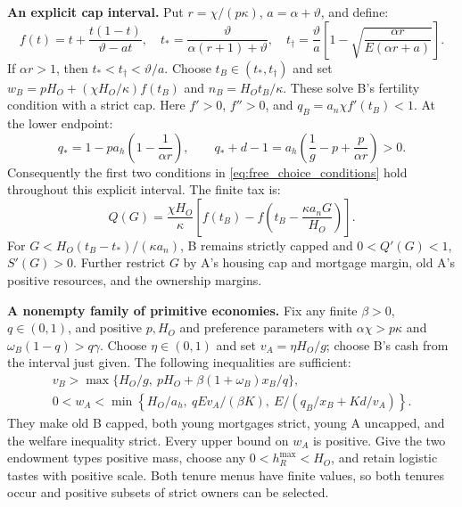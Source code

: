 \documentclass[11pt]{article}
\begin{document}
\textbf{An explicit cap interval.} Put $r=\chi/(p\kappa)$,
$a=\alpha+\vartheta$, and define:
\begin{equation}
f(t)=t+\frac{t(1-t)}{\vartheta-at},\quad
 t_* =\frac{\vartheta}{\alpha(r+1)+\vartheta},\quad
 t_\dagger=\frac{\vartheta}{a}
 \left[1-\sqrt{\frac{\alpha r}{E(\alpha r+a)}}\right].
\end{equation}
If $\alpha r>1$, then $t_*<t_\dagger<\vartheta/a$.
Choose $t_B\in(t_*,t_\dagger)$ and set
$w_B=pH_O+(\chi H_O/\kappa)f(t_B)$ and $n_B=H_Ot_B/\kappa$.
These solve B's fertility condition with a strict cap. Here
$f'>0$, $f''>0$, and $q_B=a_n\chi f'(t_B)<1$. At the lower endpoint:
\begin{equation}
q_*=1-pa_h\left(1-\frac1{\alpha r}\right),\qquad
q_*+d-1=a_h\left(\frac1g-p+\frac p{\alpha r}\right)>0.
\end{equation}
Consequently the first two conditions in \eqref{eq:free_choice_conditions}
hold throughout this explicit interval. The finite tax is:
\begin{equation}
Q(G)=\frac{\chi H_O}{\kappa}
\left[f(t_B)-f\left(t_B-\frac{\kappa a_nG}{H_O}\right)\right].
\end{equation}
For $G<H_O(t_B-t_*)/(\kappa a_n)$, B remains strictly capped and
$0<Q'(G)<1$, $S'(G)>0$. Further restrict $G$ by A's housing cap and
mortgage margin, old A's positive resources, and the ownership margins.

\textbf{A nonempty family of primitive economies.} Fix any finite
$\beta>0$, $q\in(0,1)$, and positive $p,H_O$ and preference parameters
with $\alpha\chi>p\kappa$ and $\omega_B(1-q)>q\gamma$.
Choose $\eta\in(0,1)$ and set $v_A=\eta H_O/g$; choose B's cash from
the interval just given. The following inequalities are sufficient:
\begin{equation}
\begin{gathered}
v_B>\max\{H_O/g,\ pH_O+\beta(1+\omega_B)x_B/q\},\\
0<w_A<\min\left\{H_O/a_h,\ qEv_A/(\beta K),\
 E/(q_B/x_B+Kd/v_A)\right\}.
\end{gathered}
\end{equation}
They make old B capped, both young mortgages strict, young A uncapped, and
the welfare inequality strict. Every upper bound on $w_A$ is positive.
Give the two endowment types positive mass, choose any
$0<h_R^{\max}<H_O$, and retain logistic tastes with positive scale.
Both tenure menus have finite values, so both tenures occur and positive
subsets of strict owners can be selected.
\end{document}
